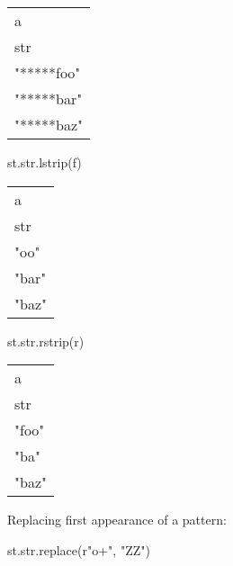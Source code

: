 \documentclass[
  letterpaper,
  DIV=11,
  numbers=noendperiod]{scrartcl}
\newenvironment{Shaded}{\begin{snugshade}}{\end{snugshade}}
\newcommand{\BuiltInTok}[1]{\textcolor[rgb]{0.00,0.23,0.31}{#1}}
\newcommand{\NormalTok}[1]{\textcolor[rgb]{0.00,0.23,0.31}{#1}}
\newcommand{\StringTok}[1]{\textcolor[rgb]{0.13,0.47,0.30}{#1}}
\newcommand{\VerbatimStringTok}[1]{\textcolor[rgb]{0.13,0.47,0.30}{#1}}
\begin{document}
\begin{longtable}[]{@{}l@{}}
\toprule()
a \\
str \\
\midrule()
\endhead
"*****foo" \\
"*****bar" \\
"*****baz" \\
\bottomrule()
\end{longtable}

\begin{Shaded}
\begin{Highlighting}[]
\NormalTok{st.}\BuiltInTok{str}\NormalTok{.lstrip(}\StringTok{\textquotesingle{}f\textquotesingle{}}\NormalTok{)}
\end{Highlighting}
\end{Shaded}

\begin{longtable}[]{@{}l@{}}
\toprule()
a \\
str \\
\midrule()
\endhead
"oo" \\
"bar" \\
"baz" \\
\bottomrule()
\end{longtable}

\begin{Shaded}
\begin{Highlighting}[]
\NormalTok{st.}\BuiltInTok{str}\NormalTok{.rstrip(}\StringTok{\textquotesingle{}r\textquotesingle{}}\NormalTok{)}
\end{Highlighting}
\end{Shaded}

\begin{longtable}[]{@{}l@{}}
\toprule()
a \\
str \\
\midrule()
\endhead
"foo" \\
"ba" \\
"baz" \\
\bottomrule()
\end{longtable}

Replacing first appearance of a pattern:

\begin{Shaded}
\begin{Highlighting}[]
\NormalTok{st.}\BuiltInTok{str}\NormalTok{.replace(}\VerbatimStringTok{r"o+"}\NormalTok{, }\StringTok{"ZZ"}\NormalTok{)  }
\end{Highlighting}
\end{Shaded}
\end{document}

